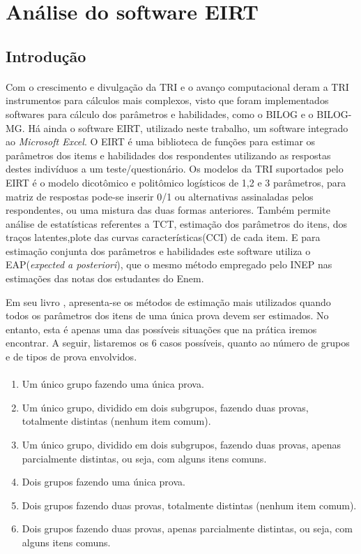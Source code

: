 	\section{Análise do software EIRT}
	\subsection{Introdução}
	\paragraph{}
    	Com o  crescimento e divulgação da TRI e o avanço computacional deram a TRI instrumentos para cálculos mais complexos, visto que foram implementados softwares para cálculo dos parâmetros e habilidades, como o BILOG e o BILOG-MG. Há ainda o software EIRT, utilizado neste trabalho, um software integrado ao \textit{Microsoft Excel}. O EIRT é uma biblioteca de funções para estimar os parâmetros dos items e habilidades dos respondentes utilizando as respostas destes indivíduos a um teste/questionário. Os modelos da TRI suportados pelo EIRT é o modelo dicotômico e politômico logísticos de 1,2 e 3 parâmetros, para matriz de respostas pode-se inserir 0/1 ou alternativas assinaladas pelos respondentes, ou uma mistura das duas formas anteriores. Também permite análise de estatísticas referentes a TCT, estimação dos parâmetros do itens,  dos traços latentes,plote das curvas características(CCI) de cada item. E para estimação conjunta dos parâmetros e habilidades este software utiliza o EAP(\textit{expected a posteriori}), que o mesmo método empregado pelo INEP nas estimações das notas dos estudantes do Enem.
	\par
    	Em seu livro \textcite{Dalton}, apresenta-se os métodos de estimação mais utilizados quando todos os parâmetros dos itens de uma única prova devem ser estimados. No entanto, esta é apenas uma das possíveis situações que na prática iremos encontrar. A seguir, listaremos os 6 casos possíveis, quanto ao número de grupos e de tipos de prova envolvidos.
    \paragraph{}
	\begin{enumerate}
		\item Um único grupo fazendo uma única prova. 
		\item Um único grupo, dividido em dois subgrupos, fazendo duas provas, totalmente distintas (nenhum item comum). 
		\item Um único grupo, dividido em dois subgrupos, fazendo duas provas, apenas parcialmente distintas, ou seja, com alguns itens comuns. 
		\item Dois grupos fazendo uma única prova. 
		\item Dois grupos fazendo duas provas, totalmente distintas (nenhum item comum). 
		\item Dois grupos fazendo duas provas, apenas parcialmente distintas, ou seja, com alguns itens comuns.
	\end{enumerate} 
